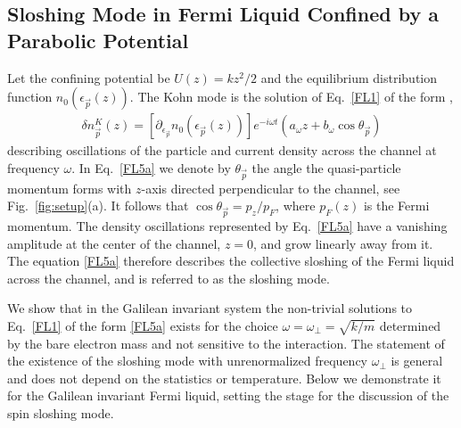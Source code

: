 \subsection{Sloshing Mode in Fermi Liquid Confined by a Parabolic Potential} 
\label{sec:Sloshing_mode}


Let the confining potential be $U(z) = k z^2/2$ and the equilibrium distribution function $n_0( \epsilon_{\vec{p}}(z) )$.
The Kohn mode is the solution of Eq.~\eqref{FL1} of the form \cite{Chiacchiera2009,Pantel2012},
\begin{align}\label{FL5a}
\delta n^K_{\vec{p}}(z) = 
[\partial_{ \epsilon_{\vec{p}}} n_0( \epsilon_{\vec{p}}(z) )]e^{- i \omega t}
\left( a_{\omega} z   + b_{\omega} \cos \theta_{\vec{p}} \right)
\end{align}
describing oscillations of the particle and current density across the channel at frequency $\omega$.
In Eq.~\eqref{FL5a} we denote by $\theta_{\vec{p}}$ the angle the quasi-particle momentum forms with $z$-axis directed perpendicular to the channel, see Fig.~\ref{fig:setup}(a).
It follows that $\cos \theta_{\vec{p}} = p_z/ p_F$, where $p_F(z)$ is the Fermi momentum.
The density oscillations represented by Eq.~\eqref{FL5a} have a vanishing amplitude at the center of the channel, $z=0$, and grow linearly away from it.
The equation \eqref{FL5a} therefore describes the collective sloshing of the Fermi liquid across the channel, and is referred to as the sloshing mode.

We show that in the Galilean invariant system the non-trivial solutions to Eq.~\eqref{FL1} of the form \eqref{FL5a} exists for the choice $\omega = \omega_{\perp}= \sqrt{k/m}$ determined by the bare electron mass and not sensitive to the interaction.
The statement of the existence of the sloshing mode with unrenormalized frequency $\omega_{\perp}$  is general and does not depend on the statistics or temperature. 
Below we demonstrate it for the Galilean invariant Fermi liquid, setting the stage for the discussion of the spin sloshing mode.

